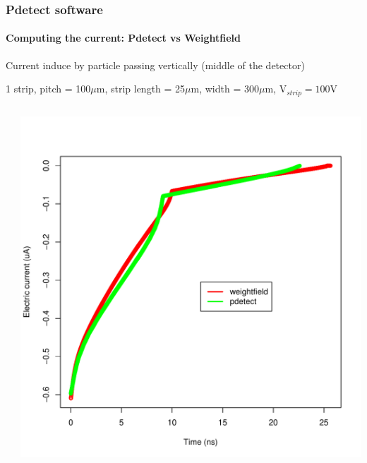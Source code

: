 \documentclass[14pt]{beamer}
\begin{document}
\begin{frame}
  \frametitle{Pdetect software}
  \framesubtitle{Computing the current: Pdetect vs Weightfield}

  \fontsize{10pt}{7.2}\selectfont
  Current induce by particle passing vertically (middle of the detector)

  1 strip, pitch = 100$\mu$m, strip length = 25$\mu$m, width = 300$\mu$m, V$_{strip} = 100$V
  \begin{columns}
    \begin{column}{0.5\textwidth}

      \begin{center}
      \end{center}
    \end{column}

    \begin{column}{0.5\textwidth}
      \begin{center}
        \includegraphics[width=\textwidth]{images/silicon_current.pdf}
      \end{center}
    \end{column}

  \end{columns}
\end{frame}
\end{document}
